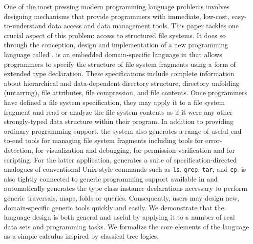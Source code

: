 One of the most pressing modern programming language problems involves
designing mechanisms that provide programmers with immediate,
low-cost, easy-to-understand data access and data management tools.
This paper tackles one crucial aspect of this problem: access to
structured file systems.  It does so through the conception, design
and implementation of a new programming language called \forest.
\forest{} is an embedded domain-specific language in \haskell{} that
allows programmers to specify the structure of file system fragments
using a form of extended type declaration.  These specifications
include complete information about hierarchical and data-dependent
directory structure, directory unfolding (untarring), file attributes,
file compression, and file contents.  Once programmers have defined a
file system specification, they may apply it to a file system fragment
and read or analyze the file system contents as if it were any other
strongly-typed data structure within their program.  In addition to
providing ordinary programming support, the \forest{} system also
generates a range of useful end-to-end tools for managing file system
fragments including tools for error-detection, for visualization and
debugging, for permission verification and for scripting.  For the
latter application, \forest{} generates a suite of
specification-directed analogues of conventional Unix-style commands
such as {\tt ls}, {\tt grep}, {\tt tar}, and {\tt cp}.  \forest{} is
also tightly connected to generic programming support available in
\haskell{} and automatically generates the type class instance
declarations necessary to perform generic traversals, maps, folds or
queries.  Consequently, users may design new, domain-specific generic
tools quickly and easily.  We demonstrate that the language design is
both general and useful by applying it to a number of real data sets
and programming tasks.  We formalize the core elements of the
language as a simple calculus inspired by classical tree logics.

